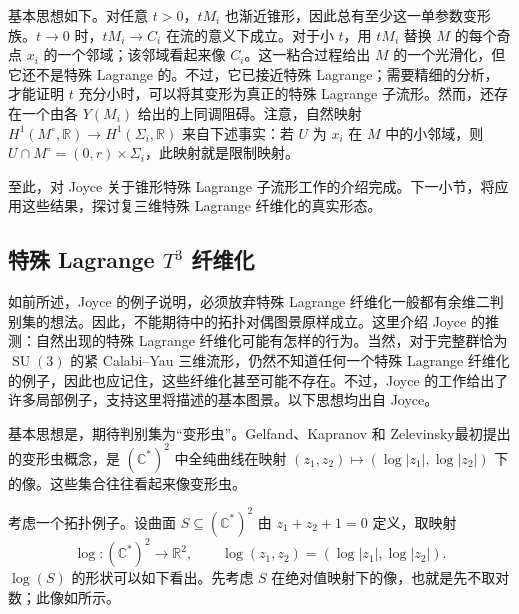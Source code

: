 基本思想如下。对任意 $t>0$，$tM_i$ 也渐近锥形，因此总有至少这一单参数变形族。$t\to0$ 时，$tM_i\to C_i$ 在流的意义下成立。对于小 $t$，用 $tM_i$ 替换 $M$ 的每个奇点 $x_i$ 的一个邻域；该邻域看起来像 $C_i$。这一粘合过程给出 $M$ 的一个光滑化，但它还不是特殊 Lagrange 的。不过，它已接近特殊 Lagrange；需要精细的分析，才能证明 $t$ 充分小时，可以将其变形为真正的特殊 Lagrange 子流形。然而，还存在一个由各 $Y(M_i)$ 给出的上同调阻碍。注意，自然映射 $H^1(M^\circ,\mathbb R)\to H^1(\Sigma_i,\mathbb R)$ 来自下述事实：若 $U$ 为 $x_i$ 在 $M$ 中的小邻域，则 $U\cap M^\circ=(0,r)\times\Sigma_i$，此映射就是限制映射。

至此，对 Joyce 关于锥形特殊 Lagrange 子流形工作的介绍完成。下一小节，将应用这些结果，探讨复三维特殊 Lagrange 纤维化的真实形态。

\subsection{特殊 Lagrange \texorpdfstring{$T^3$}{T³} 纤维化}\label{sec:7.2.6}

如前所述，Joyce 的例子说明，必须放弃特殊 Lagrange 纤维化一般都有余维二判别集的想法。因此，不能期待中的拓扑对偶图景原样成立。这里介绍 Joyce 的推测：自然出现的特殊 Lagrange 纤维化可能有怎样的行为。当然，对于完整群恰为 $\operatorname{SU}(3)$ 的紧 Calabi--Yau 三维流形，仍然不知道任何一个特殊 Lagrange 纤维化的例子，因此也应记住，这些纤维化甚至可能不存在。不过，Joyce 的工作给出了许多局部例子，支持这里将描述的基本图景。以下思想均出自 Joyce。

基本思想是，期待判别集为“变形虫”。Gelfand、Kapranov 和 Zelevinsky最初提出的变形虫概念，是 $(\mathbb C^*)^2$ 中全纯曲线在映射 $(z_1,z_2)\mapsto(\log|z_1|,\log|z_2|)$ 下的像。这些集合往往看起来像变形虫。

考虑一个拓扑例子。设曲面 $S\subseteq(\mathbb C^*)^2$ 由 $z_1+z_2+1=0$ 定义，取映射
\[
\log\colon(\mathbb C^*)^2\longrightarrow\mathbb R^2,
\qquad\log(z_1,z_2)=(\log|z_1|,\log|z_2|).
\]
$\log(S)$ 的形状可以如下看出。先考虑 $S$ 在绝对值映射下的像，也就是先不取对数；此像如所示。
\begin{figure}[H]
\centering
{}
\BookNumberOnlyCaption\label{fig:7.7}
\end{figure}

